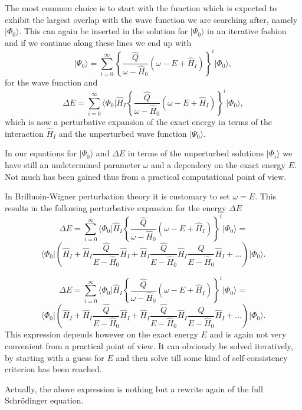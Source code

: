 The most common choice is to start with the function which is expected to exhibit the largest overlap with the wave function we are searching after, namely $\vert \Phi_0\rangle$. This can again be inserted in the solution for $\vert \Psi_0\rangle$ in an iterative fashion and if we continue along these lines we end up with
\[
\vert \Psi_0\rangle=\sum_{i=0}^{\infty}\left\{\frac{\hat{Q}}{\omega-\hat{H}_0}\left(\omega-E+\hat{H}_I\right)\right\}^i\vert \Phi_0\rangle, 
\]
for the wave function and
\[
\Delta E=\sum_{i=0}^{\infty}\langle \Phi_0\vert \hat{H}_I\left\{\frac{\hat{Q}}{\omega-\hat{H}_0}\left(\omega-E+\hat{H}_I\right)\right\}^i\vert \Phi_0\rangle, 
\]
which is now  a perturbative expansion of the exact energy in terms of the interaction
$\hat{H}_I$ and the unperturbed wave function $\vert \Psi_0\rangle$.



In our equations for $\vert \Psi_0\rangle$ and $\Delta E$ in terms of the unperturbed
solutions $\vert \Phi_i\rangle$  we have still an undetermined parameter $\omega$
and a dependecy on the exact energy $E$. Not much has been gained thus from a practical computational point of view. 

In Brilluoin-Wigner perturbation theory it is customary to set $\omega=E$. This results in the following perturbative expansion for the energy $\Delta E$
\[
\Delta E=\sum_{i=0}^{\infty}\langle \Phi_0\vert \hat{H}_I\left\{\frac{\hat{Q}}{\omega-\hat{H}_0}\left(\omega-E+\hat{H}_I\right)\right\}^i\vert \Phi_0\rangle=
\]
\[
\langle \Phi_0\vert \left(\hat{H}_I+\hat{H}_I\frac{\hat{Q}}{E-\hat{H}_0}\hat{H}_I+
\hat{H}_I\frac{\hat{Q}}{E-\hat{H}_0}\hat{H}_I\frac{\hat{Q}}{E-\hat{H}_0}\hat{H}_I+\dots\right)\vert \Phi_0\rangle. 
\]

\[
\Delta E=\sum_{i=0}^{\infty}\langle \Phi_0\vert \hat{H}_I\left\{\frac{\hat{Q}}{\omega-\hat{H}_0}\left(\omega-E+\hat{H}_I\right)\right\}^i\vert \Phi_0\rangle=\]
\[
\langle \Phi_0\vert \left(\hat{H}_I+\hat{H}_I\frac{\hat{Q}}{E-\hat{H}_0}\hat{H}_I+
\hat{H}_I\frac{\hat{Q}}{E-\hat{H}_0}\hat{H}_I\frac{\hat{Q}}{E-\hat{H}_0}\hat{H}_I+\dots\right)\vert \Phi_0\rangle. 
\]
This expression depends however on the exact energy $E$ and is again not very convenient from a practical point of view. It can obviously be solved iteratively, by starting with a guess for  $E$ and then solve till some kind of self-consistency criterion has been reached. 

Actually, the above expression is nothing but a rewrite again of the full Schr\"odinger equation. 


